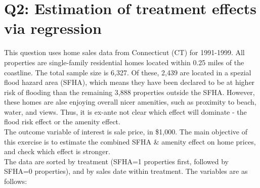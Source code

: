 \documentclass[11pt,reqno]{amsart}\usepackage[]{graphicx}\usepackage[]{color}
\begin{document}
\section{Q2: Estimation of treatment effects via regression}
This question uses home sales data from Connecticut (CT) for 1991-1999. All properties are single-family residential homes located within 0.25 miles of the coastline. The total sample size is 6,327. Of these, 2,439 are located in a spezial flood hazard area (SFHA), which means they have been declared to be at higher risk of flooding than the remaining 3,888 properties outside the SFHA. However, these homes are alse enjoying overall nicer amenities, such as proximity to beach, water, and views. Thus, it is ex-ante not clear which effect will dominate - the flood risk effect or the amenity effect.\\

The outcome variable of interest is sale price, in \$1,000. The main objective of this exercise is to estimate the combined SFHA \& amenity effect on home prices, and check which effect is stronger.\\

The data are sorted by treatment (SFHA=1 properties first, followed by SFHA=0 properties), and by sales date within treatment. The variables are as follows:\\
\end{document}
